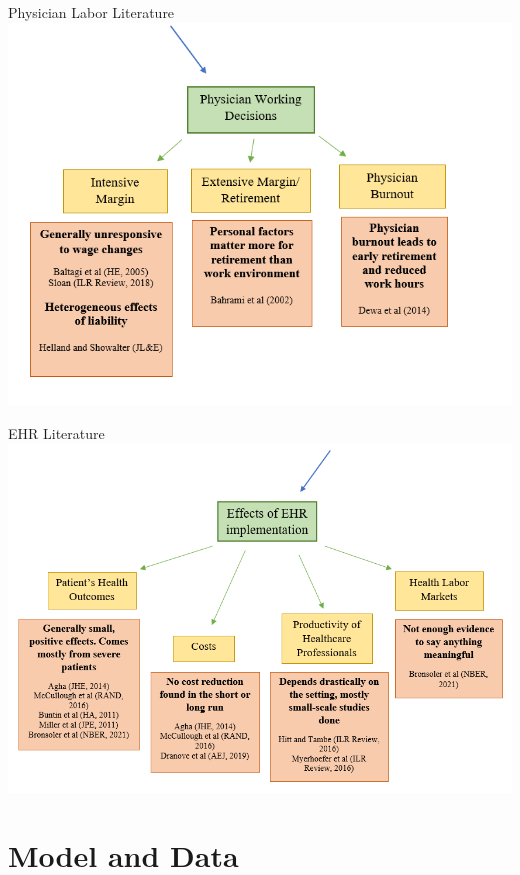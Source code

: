 \documentclass[10pt]{beamer}
\begin{document}
\begin{frame}{Physician Labor Literature}
\centering
    \includegraphics[scale=.45]{graphics/labor_litgraphic.PNG}
\end{frame}

\begin{frame}{EHR Literature}
    \centering
    \includegraphics[scale=.45]{graphics/EHR_litgraphic.PNG}
\end{frame}


\section{Model and Data}
\end{document}
